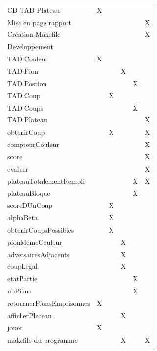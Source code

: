 \documentclass{article}
\begin{document}
\begin{tabular}{|l|c|c|c|c|c|}
  CD TAD Plateau & X & & & & \\                              
  Mise en page rapport & & & & & X \\      
  Création Makefile & & & & & X \\
  \hline
  Developpement \\
  \hline
  TAD Couleur & X & & & & \\                                                                                                                                                                       
  TAD Pion & & & X & & \\                                                                                                                                                                              
  TAD Postion & & & & X &  \\                                                                                                                                                                          
  TAD Coup & & X & &  & \\                                                                                                                                                                              
  TAD Coups & & & & X & \\                                                                                                                                                                             
  TAD Plateau & & & & & X \\                                                                                                                                                                      
  obtenirCoup & & X & & & X \\
  compteurCouleur & & & & & X \\
  score & & & & & X \\
  evaluer & & & & & X \\
  plateauTotalementRempli & & & & X & X \\
  plateauBloque & & & & X & \\
  scoreDUnCoup & & X & & & \\
  alphaBeta & & X & & & \\
  obtenirCoupsPossibles & & X & & & \\
  pionMemeCouleur & & & X & & \\
  adversairesAdjacents & & & X & & \\
  coupLegal & & & X & & \\
  etatPartie & & & & X & \\
  nbPions & & & & X & \\
  retournerPionsEmprisonnes & X & & & & \\
  afficherPlateau & & & X & & \\
  jouer & X & & & & \\
  makefile du programme & & & X & & X \\
  \hline
 \end{tabular}   
\end{document}
